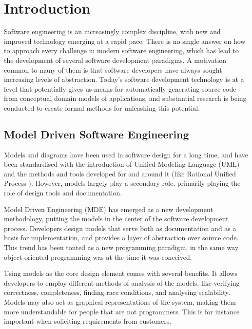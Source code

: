 \chapter{Introduction}
\label{chap:introduction}
 
Software engineering is an increasingly complex discipline, with new and
improved technology emerging at a rapid pace. There is no single answer on how
to approach every challenge in modern software engineering, which has lead to
the development of several software development paradigms. A motivation common
to many of them is that software developers have always sought increasing levels
of abstraction.
Today's software development technology is at a level that potentially gives us
means for automatically generating source code from conceptual domain models of
applications, and substantial research is being conducted to create formal
methods for unleashing this potential.


\section{Model Driven Software Engineering}

Models and diagrams have been used in software design for a long time, and have
been standardised with the introduction of Unified Modeling Language (UML)
\cite{umlInfra} and the methods and tools developed for and around it (like
Rational Unified Process \cite{rup}).
However, models largely play a secondary role, primarily playing the role of
design tools and documentation.

Model Driven Engineering (MDE) \cite{kent2002model} has emerged as a new
development methodology, putting the models in the center of the software
development process. Developers design models that serve both as documentation
and as a basis for implementation, and provides a layer of abstraction over
source code. This trend has been touted as a new programming paradigm, in the
same way object-oriented programming was at the time it was conceived.

Using models as the core design element comes with several benefits. It allows
developers to employ different methods of analysis of the models, like verifying
correctness, completeness, finding race conditions, and analysing scalability.
Models may also act as graphical representations of the system, making them more
understandable for people that are not programmers. This is for instance
important when soliciting requirements from customers.

